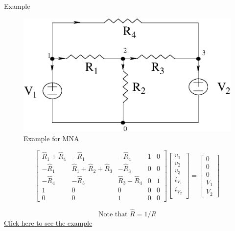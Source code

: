 \documentclass{beamer}
\begin{document}
\begin{frame}
\begin{block}{Example}
\begin{figure}[!ht]
\begin{center}
\includegraphics[scale=0.35]{../figures/modified_figure.eps}
\caption{ Example for MNA } \label{modifiedfig}
\end{center}
\end{figure}
\begin{tiny}
$$\left[
\begin{array}{cccccc}
\widehat{R}_{1}+\widehat{R}_{4} & -\widehat{R}_{1} & -\widehat{R}_{4} & 1 & 0 \\
-\widehat{R}_{1} & \widehat{R}_{1}+\widehat{R}_{2}+\widehat{R}_{3} & -\widehat{R}_{3} & 0 & 0 \\
-\widehat{R}_{4} & -\widehat{R}_{3} & \widehat{R}_{3}+\widehat{R}_{4} & 0 & 1  \\
1 & 0 & 0 & 0 & 0 \\
0 & 0 & 1 & 0 & 0
\end{array}
\right] \left[
\begin{array}{c}
v_{1}\\
v_{2}\\
v_{3}\\
i_{V_1}\\
i_{V_2}\\
\end{array}
\right]= \left[
\begin{array}{c}
0\\
0\\
0\\
V_{1}\\
V_{2}
\end{array}
\right]$$
\end{tiny}
\tiny $$\mbox{Note that } \widehat{R}=1/R$$
\tiny \href{run:../../LPCSim_1.0/ckt/modifiedNodalExample.ckt}{\color{red} Click here to see the example}
\end{block}
\end{frame}
\end{document}
